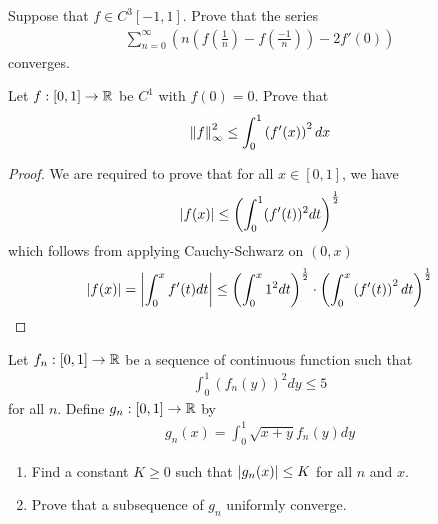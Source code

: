 \documentclass{report}
\begin{document}
\begin{question}{}{}
Suppose that $f \in C^3[-1,1]$. Prove that the series 
\begin{align*}
\sum_{n=0}^{\infty} \left( n\left(f\left(\frac{1}{n} \right)- f\left(\frac{-1}{n} \right) \right) - 2f'(0)\right)
\end{align*}
converges.  
\end{question}
\begin{question}{}{}
Let $f:[0,1]\rightarrow \mathbb{R}$ be $C^1$ with  $f(0)=0$. Prove that 
\begin{align*}
\left\| f \right\|^2_{\infty}\leq \int_0^1 \left(f'(x) \right)^2dx
\end{align*}
\end{question}
\begin{proof}
We are required to prove that for all $x \in [0,1]$, we have 
\begin{align*}
  \left|f(x)\right| \leq \left(\int_0^1 (f'(t))^2 dt \right)^{\frac{1}{2}}
\end{align*}
which follows from applying Cauchy-Schwarz on $(0,x)$ 
\begin{align*}
\left|f(x)\right|= \left|\int_0^xf'(t)dt\right|\leq \left(\int_0^x 1^2dt \right)^{\frac{1}{2}} \cdot \left(\int_0^x \left(f'(t) \right)^2dt \right)^{\frac{1}{2}}
\end{align*}
\end{proof}
\begin{question}{}{}
Let $f_n:[0,1]\rightarrow \mathbb{R}$ be a sequence of continuous function such that 
\begin{align*}
\int_0^1 \left(f_n(y) \right)^2 dy \leq 5
\end{align*}
for all $n$. Define  $g_n:[0,1]\rightarrow \mathbb{R}$ by 
\begin{align*}
g_n(x)= \int_0^1 \sqrt{x+y} f_n(y)dy 
\end{align*}
\begin{enumerate}[label=(\roman*)]
  \item Find a constant $K\geq 0$ such that $\left|g_n(x)\right|\leq K$ for all $n$ and $x$. 
  \item Prove that a subsequence of $g_n$ uniformly converge.  
\end{enumerate}
\end{question}
\end{document}
